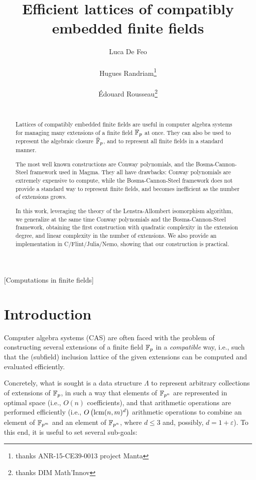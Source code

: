 \documentclass{sig-alternate}
\author{
  \alignauthor Luca De Feo\\
  \affaddr{Universit\'e Paris Saclay -- UVSQ, LMV}\\
  \email{luca.de-feo@uvsq.fr}
  \alignauthor Hugues Randriam\footnote{thanks ANR-15-CE39-0013 project Manta}\\ %
  \affaddr{LTCI, T\'el\'ecom ParisTech}\\
  \email{randriam@enst.fr}
  \alignauthor \'Edouard Rousseau\footnote{thanks DIM Math'Innov}\\ %
  \affaddr{LTCI, T\'el\'ecom ParisTech, UVSQ, LMV}\\
  \email{erousseau@enst.fr}
}
\title{Efficient lattices of compatibly embedded finite fields}
\begin{document}
\maketitle

\begin{abstract}
  Lattices of compatibly embedded finite fields are useful in computer
  algebra systems for managing many extensions of a finite field
  $\mathbb{F}_p$ at once. %
  They can also be used to represent the algebraic closure $\bar{\mathbb{F}}_p$,
  and to represent all finite fields in a standard manner.

  The most well known constructions are Conway polynomials, and the
  Bosma-Cannon-Steel framework used in Magma. %
  They all have drawbacks: Conway polynomials are extremely expensive
  to compute, while the Bosma-Cannon-Steel framework does not provide
  a standard way to represent finite fields, and becomes inefficient
  as the number of extensions grows.

  In this work, leveraging the theory of the Lenstra-Allombert
  isomorphism algorithm, we generalize at the same time Conway
  polynomials and the Bosma-Cannon-Steel framework, obtaining the
  first construction with quadratic complexity in the extension
  degree, and linear complexity in the number of extensions. %
  We also provide an implementation in C/Flint/Julia/Nemo, showing
  that our construction is practical.
\end{abstract}

[Computations in finite fields]

\section{Introduction}
\label{sec:introduction}

Computer algebra systems (CAS) are often faced with the problem of
constructing several extensions of a finite field $\mathbb{F}_p$ in a
\emph{compatible} way, i.e., such that the (subfield) inclusion
lattice of the given extensions can be computed and evaluated
efficiently.

Concretely, what is sought is a data structure $\Lambda$ to represent
arbitrary collections of extensions of $\mathbb{F}_{p}$, in such a way that
elements of $\mathbb{F}_{p^n}$ are represented in optimal space (i.e., $O(n)$
coefficients), and that arithmetic operations are performed
efficiently (i.e., $O\left(\operatorname{lcm}(n,m)^d\right)$ arithmetic operations
to combine an element of $\mathbb{F}_{p^m}$ and an element of $\mathbb{F}_{p^n}$,
where $d\le 3$ and, possibly, $d=1+\varepsilon$). %
To this end, it is useful to set several sub-goals:
\end{document}
